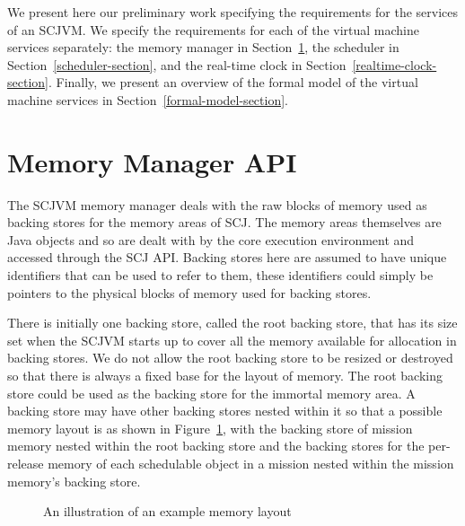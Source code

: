 \documentclass[a4paper,10pt]{report}
\begin{document}
We present here our preliminary work specifying the requirements for the
services of an SCJVM.  We specify the requirements for each of the virtual
machine services separately: the memory manager in
Section~\ref{memory-manager-section}, the scheduler in
Section~\ref{scheduler-section}, and the real-time clock in
Section~\ref{realtime-clock-section}.  Finally, we present an overview of the
formal model of the virtual machine services in
Section~\ref{formal-model-section}.

\section{Memory Manager API}
\label{memory-manager-section}

The SCJVM memory manager deals with the raw blocks of memory used as backing
stores for the memory areas of SCJ. The memory areas themselves are Java objects
and so are dealt with by the core execution environment and accessed through the
SCJ API. Backing stores here are assumed to have unique identifiers that can be
used to refer to them, these identifiers could simply be pointers to the
physical blocks of memory used for backing stores.

There is initially one backing store, called the root backing store, that has
its size set when the SCJVM starts up to cover all the memory available for
allocation in backing stores. We do not allow the root backing store to be
resized or destroyed so that there is always a fixed base for the layout of 
memory. The root backing store could be used as the backing store for the
immortal memory area. A backing store may have other backing stores nested
within it so that a possible memory layout is as shown in 
Figure~\ref{memory-fig}, with the backing store of mission memory nested within
the root backing store and the backing stores for the per-release memory of each
schedulable object in a mission nested within the mission memory's backing
store.

\begin{figure}[ht]
  \centering
  \caption{An illustration of an example memory layout}
  \label{memory-fig}
\end{figure}
\end{document}
